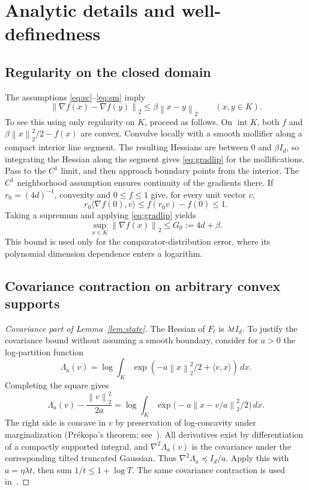 \documentclass[11pt]{article}
\numberwithin{equation}{section}
\newcommand{\ip}[2]{\langle #1,#2\rangle}
\newcommand{\norm}[1]{\left\|#1\right\|}
\theoremstyle{definition}
\theoremstyle{remark}
\begin{document}
\clearpage
\appendix
\section{Analytic details and well-definedness}\label{app:analytic}
\subsection{Regularity on the closed domain}\label{app:regularity}
The assumptions \eqref{eq:sc}--\eqref{eq:sm} imply
\begin{equation}\label{eq:gradlip}
 \norm{\nabla f(x)-\nabla f(y)}_2\leq\beta\norm{x-y}_2
 \qquad(x,y\in K).
\end{equation}
To see this using only regularity on $K$, proceed as follows. On
$\operatorname{int}K$, both $f$ and $\beta\norm{x}_2^2/2-f(x)$ are convex.
Convolve locally with a smooth mollifier along a compact interior line segment.
The resulting Hessians are between $0$ and $\beta I_d$, so integrating the
Hessian along the segment gives \eqref{eq:gradlip} for the mollifications.
Pass to the $C^1$ limit, and then approach boundary points from the interior.
The $C^1$ neighborhood assumption ensures continuity of the gradients there.
If $r_0=(4d)^{-1}$, convexity and $0\leq f\leq1$ give, for every unit vector $v$,
\[
 r_0\ip{\nabla f(0)}v\leq f(r_0v)-f(0)\leq1.
\]
Taking a supremum and applying \eqref{eq:gradlip} yields
\begin{equation}\label{eq:globalGappendix}
 \sup_{x\in K}\norm{\nabla f(x)}_2\leq G_0:=4d+\beta.
\end{equation}
This bound is used only for the comparator-distribution error, where its
polynomial dimension dependence enters a logarithm.


\subsection{Covariance contraction on arbitrary convex supports}
\begin{proof}[Covariance part of Lemma~\ref{lem:state}]
The Hessian of $F_t$ is $\lambda tI_d$. To justify the covariance bound without
assuming a smooth boundary, consider for $a>0$ the log-partition function
\[
 \Lambda_a(v)=\log\int_K\exp(-a\norm{x}_2^2/2+\ip vx)\,dx.
\]
Completing the square gives
\[
 \Lambda_a(v)-\frac{\norm v_2^2}{2a}
 =\log\int_K\exp\bigl(-a\norm{x-v/a}_2^2/2\bigr)\,dx.
\]
The right side is concave in $v$ by preservation of log-concavity under
marginalization (Pr\'ekopa's theorem; see~\cite[Theorem 5.1]{LV07}).
All derivatives exist by differentiation of a compactly supported integral,
and $\nabla^2\Lambda_a(v)$ is the covariance under the corresponding tilted
truncated Gaussian. Thus $\nabla^2\Lambda_a\preceq I_d/a$.
Apply this with $a=\eta\lambda t$, then sum $1/t\leq1+\log T$.
The same covariance contraction is used in~\cite[Lemma 2]{Ito20}.
\end{proof}
\end{document}
